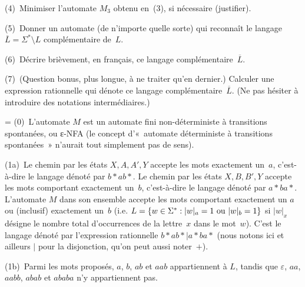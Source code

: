 \documentclass[12pt,a4paper]{article}
\theoremstyle{definition}
\newif\ifcorrige
\newenvironment{corrige}%
{\ifcorrige\relax\else\setbox0=\vbox\bgroup\fi%
\smallbreak\footnotesize\noindent{\underbar{\textit{Corrigé.}}\quad}}
{{\hbox{}\nobreak\hfill\checkmark}%
\ifcorrige\relax\else\egroup\fi\par}
\begin{document}
(4) Minimiser l'automate $M_3$ obtenu en (3), si nécessaire
(justifier).

(5) Donner un automate (de n'importe quelle sorte) qui reconnaît le
langage $\overline{L} = \Sigma^*\setminus L$ complémentaire de $L$.

(6) Décrire brièvement, en français, ce langage
complémentaire $\overline{L}$.

(7) (Question bonus, plus longue, à ne traiter qu'en dernier.)
Calculer une expression rationnelle qui dénote ce langage
complémentaire $\overline{L}$.  (Ne pas hésiter à introduire des
notations intermédiaires.)

\begin{corrige}
(0) L'automate $M$ est un automate fini non-déterministe à transitions
  spontanées, ou ε-NFA (le concept d'« automate déterministe à
  transitions spontanées » n'aurait tout simplement pas de sens).

\smallbreak

(1a) Le chemin par les états $X,A,A',Y$ accepte les mots exactement
un $a$, c'est-à-dire le langage dénoté par $b{*}ab{*}$.  Le chemin par
les états $X,B,B',Y$ accepte les mots comportant exactement un $b$,
c'est-à-dire le langage dénoté par $a{*}ba{*}$.  L'automate $M$ dans
son ensemble accepte les mots comportant exactement un $a$ ou
(inclusif) exactement un $b$ (i.e. $L = \{w\in\Sigma^* : |w|_a = 1
\penalty0\ \textrm{ou}\penalty0\ |w|_b = 1\}$ si $|w|_x$ désigne le
nombre total d'occurrences de la lettre $x$ dans le mot $w$).  C'est
le langage dénoté par l'expression rationnelle $b{*}ab{*} | a{*}ba{*}$
(nous notons ici et ailleurs $|$ pour la disjonction, qu'on peut aussi
noter $+$).

(1b) Parmi les mots proposés, $a$, $b$, $ab$ et $aab$ appartiennent à
$L$, tandis que $\varepsilon$, $aa$, $aabb$, $abab$ et $ababa$ n'y
appartiennent pas.

\smallbreak


\end{corrige}
\end{document}
